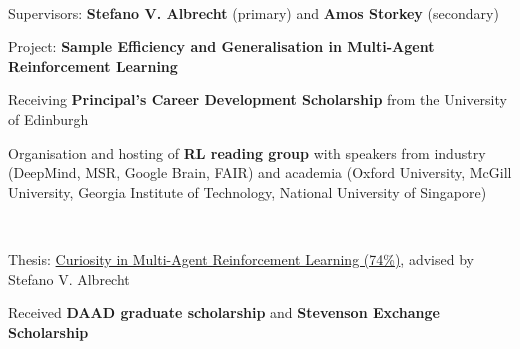 \documentclass[]{lukas-cv-openfont}
\begin{document}

\noindent
{}
\\
\begin{tightitemize}{1.7em}
    \item Supervisors: \textbf{Stefano V. Albrecht} (primary) and \textbf{Amos Storkey} (secondary)
    \item Project: \textbf{Sample Efficiency and Generalisation in Multi-Agent Reinforcement Learning}
    \item Receiving \textbf{Principal's Career Development Scholarship} from the University of Edinburgh
    \item Organisation and hosting of \textbf{RL reading group} with speakers from industry (DeepMind, MSR, Google Brain, FAIR) and academia (Oxford University, McGill University, Georgia Institute of Technology, National University of Singapore)

\end{tightitemize}
\sectionsep

\noindent
{}
\\
\begin{tightitemize}{1.7em}
    \item Thesis: \href{https://www.lukaschaefer.com/assets/files/msc_thesis.pdf}{Curiosity in Multi-Agent Reinforcement Learning (74\%)}, advised by Stefano V. Albrecht
    \item Received \textbf{DAAD graduate scholarship} and \textbf{Stevenson Exchange Scholarship} 
\end{tightitemize}
\sectionsep
\end{document}
